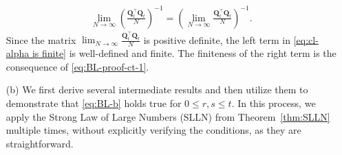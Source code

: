 \begin{enumerate}[label=(\alph*)]
        \begin{align*}
            \lim_{N \rightarrow \infty} \left(\frac{\bm{Q}_t^\top \bm{Q}_t}{N}\right)^{-1}
            =
            \left(\lim_{N \rightarrow \infty}\frac{\bm{Q}_t^\top \bm{Q}_t}{N}\right)^{-1}.
        \end{align*}
        Since the matrix $\lim_{N \rightarrow \infty} \frac{\bm{Q}_t^\top \bm{Q}_t}{N}$ is positive definite, the left term in \eqref{eq:cl-alpha is finite} is well-defined and finite. The finiteness of the right term is the consequence of \eqref{eq:BL-proof-ct-1}. \ep

        \item[(b)] We first derive several intermediate results and then utilize them to demonstrate that \eqref{eq:BL-b} holds true for $0 \leq r, s \leq t$. In this process, we apply the Strong Law of Large Numbers (SLLN) from Theorem~\ref{thm:SLLN} multiple times, without explicitly verifying the conditions, as they are straightforward.


\end{enumerate}
